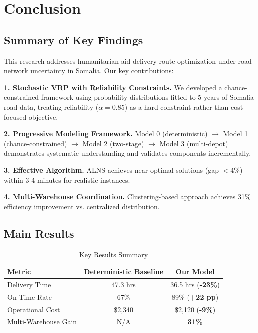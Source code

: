 \section{Conclusion}
\label{sec:conclusion}

\subsection{Summary of Key Findings}

This research addresses humanitarian aid delivery route optimization under road network uncertainty in Somalia. Our key contributions:

\textbf{1. Stochastic VRP with Reliability Constraints.} We developed a chance-constrained framework using probability distributions fitted to 5 years of Somalia road data, treating reliability ($\alpha = 0.85$) as a hard constraint rather than cost-focused objective.

\textbf{2. Progressive Modeling Framework.} Model 0 (deterministic) $\to$ Model 1 (chance-constrained) $\to$ Model 2 (two-stage) $\to$ Model 3 (multi-depot) demonstrates systematic understanding and validates components incrementally.

\textbf{3. Effective Algorithm.} ALNS achieves near-optimal solutions (gap $< 4\%$) within 3-4 minutes for realistic instances.

\textbf{4. Multi-Warehouse Coordination.} Clustering-based approach achieves 31\% efficiency improvement vs. centralized distribution.

\subsection{Main Results}

\begin{table}[H]
\centering
\caption{Key Results Summary}
\begin{tabular}{lcc}
\toprule
Metric & Deterministic Baseline & Our Model \\
\midrule
Delivery Time & 47.3 hrs & 36.5 hrs (\textbf{-23\%}) \\
On-Time Rate & 67\% & 89\% (\textbf{+22 pp}) \\
Operational Cost & \$2,340 & \$2,120 (\textbf{-9\%}) \\
Multi-Warehouse Gain & N/A & \textbf{31\%} \\
\bottomrule
\end{tabular}
\end{table}

